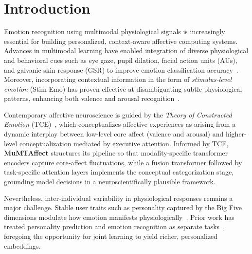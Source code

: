 \documentclass[sigconf]{acmart}
\begin{document}






\maketitle


\section{Introduction}

Emotion recognition using multimodal physiological signals is increasingly essential for building personalized, context‑aware affective computing systems. Advances in multimodal learning have enabled integration of diverse physiological and behavioral cues such as eye gaze, pupil dilation, facial action units (AUs), and galvanic skin response (GSR) to improve emotion classification accuracy~\cite{Ahmed2023,Subramanian2018,Elalamy2021,Harris2023}. Moreover, incorporating contextual information in the form of \emph{stimulus-level emotion} (Stim Emo) has proven effective at disambiguating subtle physiological patterns, enhancing both valence and arousal recognition~\cite{Paulmann2011,Tian2021,Malhotra2023,Pinitas2024}.

Contemporary affective neuroscience is guided by the \emph{Theory of Constructed Emotion} (TCE)~\cite{barrett2017theory}, which conceptualizes affective experiences as arising from a dynamic interplay between low-level core affect (valence and arousal) and higher-level conceptualization mediated by executive attention. Informed by TCE, \textbf{MuMTAffect} structures its pipeline so that modality‑specific transformer encoders capture core‑affect fluctuations, while a fusion transformer followed by task‑specific attention layers implements the conceptual categorization stage, grounding model decisions in a neuroscientifically plausible framework.

Nevertheless, inter‑individual variability in physiological responses remains a major challenge. Stable user traits such as personality captured by the Big Five dimensions modulate how emotion manifests physiologically~\cite{Li2022,Yang2024,Yildirim2023,Kashani2023}. Prior work has treated personality prediction and emotion recognition as separate tasks~\cite{Henderson2021,Benouis2023}, foregoing the opportunity for joint learning to yield richer, personalized embeddings.
\end{document}
